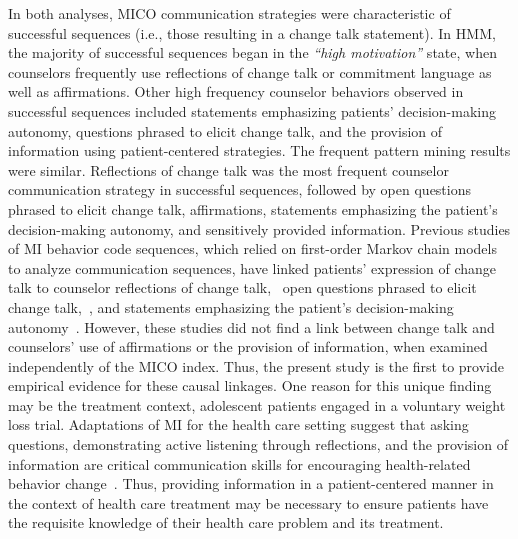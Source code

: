 In both analyses, MICO communication strategies were characteristic of successful sequences (i.e., those resulting in a change talk statement). In HMM, the majority of successful sequences began in the \textit{``high motivation''} state, when counselors frequently use reflections of change talk or commitment language as well as affirmations. Other high frequency counselor behaviors observed in successful sequences included statements emphasizing patients' decision-making autonomy, questions phrased to elicit change talk, and the provision of information using patient-centered strategies. The frequent pattern mining results were similar. Reflections of change talk was the most frequent counselor communication strategy in successful sequences, followed by open questions phrased to elicit change talk, affirmations, statements emphasizing the patient's decision-making autonomy, and sensitively provided information. Previous studies of MI behavior code sequences, which relied on first-order Markov chain models to analyze communication sequences, have linked patients' expression of change talk to counselor reflections of change talk,~\cite{moyers2009session, gaume2010counselor, glynn2014change, carcone2013provider, jacques2016building} open questions phrased to elicit change talk,~\cite{moyers2009session, carcone2013provider, jacques2016building}, and statements emphasizing the patient's decision-making autonomy~\cite{carcone2013provider, jacques2016building}. However, these studies did not find a link between change talk and counselors' use of affirmations or the provision of information, when examined independently of the MICO index. Thus, the present study is the first to provide empirical evidence for these causal linkages. One reason for this unique finding may be the treatment context, adolescent patients engaged in a voluntary weight loss trial. Adaptations of MI for the health care setting suggest that asking questions, demonstrating active listening through reflections, and the provision of information are critical communication skills for encouraging health-related behavior change~\cite{douaihy2015motivational}. Thus, providing information in a patient-centered manner in the context of health care treatment may be necessary to ensure patients have the requisite knowledge of their health care problem and its treatment. 

